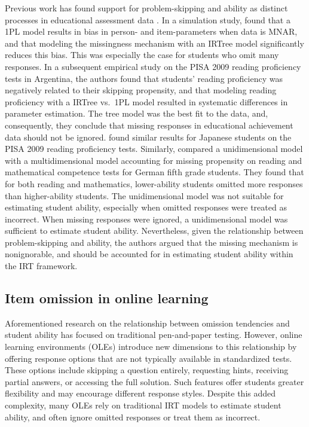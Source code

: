 \documentclass[manuscript]{acmart}
\begin{document}
Previous work has found support for problem-skipping and ability as distinct processes in educational assessment data \cite{okumura2014empirical, pohl2014dealing, debeer2017modeling, huang2020mixture, holman2005modelling}. In a simulation study, \citet{debeer2017modeling} found that a 1PL model results in bias in person- and item-parameters when data is MNAR, and that modeling the missingness mechanism with an IRTree model significantly reduces this bias. This was especially the case for students who omit many responses. In a subsequent empirical study on the PISA 2009 reading proficiency tests in Argentina, the authors found that students' reading proficiency was negatively related to their skipping propensity, and that modeling reading proficiency with a IRTree vs.\ 1PL model resulted in systematic differences in parameter estimation. The tree model was the best fit to the data, and, consequently, they conclude that missing responses in educational achievement data should not be ignored. \citet{okumura2014empirical} found similar results for Japanese students on the PISA 2009 reading proficiency tests. Similarly, \citet{pohl2014dealing} compared a unidimensional model with a multidimensional model accounting for missing propensity on reading and mathematical competence tests for German fifth grade students. They found that for both reading and mathematics, lower-ability students omitted more responses than higher-ability students. The unidimensional model was not suitable for estimating student ability, especially when omitted responses were treated as incorrect. When missing responses were ignored, a unidimensional model was sufficient to estimate student ability. Nevertheless, given the relationship between problem-skipping and ability, the authors argued that the missing mechanism is nonignorable, and should be accounted for in estimating student ability within the IRT framework. 

\subsection{Item omission in online learning}
Aforementioned research on the relationship between omission tendencies and student ability has focused on traditional pen-and-paper testing. However, online learning environments (OLEs) introduce new dimensions to this relationship by offering response options that are not typically available in standardized tests. These options include skipping a question entirely, requesting hints, receiving partial answers, or accessing the full solution. Such features offer students greater flexibility and may encourage different response styles. Despite this added complexity, many OLEs rely on traditional IRT models to estimate student ability, and often ignore omitted responses or treat them as incorrect.
\end{document}
